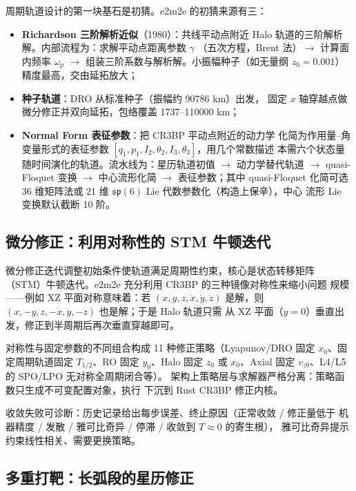 周期轨道设计的第一块基石是初猜。e2m2e 的初猜来源有三：

\begin{itemize}
  \item \textbf{Richardson 三阶解析近似}（1980）：共线平动点附近 Halo
        轨道的三阶解析解。内部流程为：求解平动点距离参数 $\gamma$
        （五次方程，Brent 法）$\to$ 计算面内频率 $\omega_p$ $\to$
        组装三阶系数与解析解。小振幅种子（如无量纲 $z_0 = 0.001$）
        精度最高，交由延拓放大；
  \item \textbf{种子轨道}：DRO 从标准种子（振幅约 90786 km）出发，
        固定 $x$ 轴穿越点做微分修正并双向延拓，包络覆盖
        1737--110000 km；
  \item \textbf{Normal Form 表征参数}：把 CR3BP 平动点附近的动力学
        化简为作用量--角变量形式的表征参数
        $[q_1, p_1, I_2, \theta_2, I_3, \theta_3]$，用几个常数描述
        本需六个状态量随时间演化的轨道。流水线为：星历轨道初值 $\to$
        动力学替代轨道 $\to$ quasi-Floquet 变换 $\to$ 中心流形化简
        $\to$ 表征参数；其中 quasi-Floquet 化简可选 36 维矩阵法或
        21 维 $\mathfrak{sp}(6)$ Lie 代数参数化（构造上保辛），中心
        流形 Lie 变换默认截断 10 阶。
\end{itemize}

\subsection{微分修正：利用对称性的 STM 牛顿迭代}

微分修正迭代调整初始条件使轨道满足周期性约束，核心是状态转移矩阵
（STM）牛顿迭代。e2m2e 充分利用 CR3BP 的三种镜像对称性来缩小问题
规模——例如 XZ 平面对称意味着：若
$(x, y, z, \dot x, \dot y, \dot z)$ 是解，则
$(x, -y, z, -\dot x, \dot y, -\dot z)$ 也是解；于是 Halo 轨道只需
从 XZ 平面（$y = 0$）垂直出发，修正到半周期后再次垂直穿越即可。

对称性与固定参数的不同组合构成 11 种修正策略（Lyapunov/DRO 固定
$x_0$、固定周期轨道固定 $T_{1/2}$、RO 固定 $y_0$、Halo 固定 $z_0$ 或
$x_0$、Axial 固定 $v_{z0}$、L4/L5 的 SPO/LPO 无对称全周期闭合等）。
架构上策略层与求解器严格分离：策略函数只生成不可变配置对象，执行
下沉到 Rust CR3BP 修正内核。

收敛失败可诊断：历史记录给出每步误差、终止原因（正常收敛 / 修正量低于
机器精度 / 发散 / 雅可比奇异 / 停滞 / 收敛到 $T \approx 0$ 的寄生根），
雅可比奇异提示约束线性相关、需要更换策略。

\subsection{多重打靶：长弧段的星历修正}

